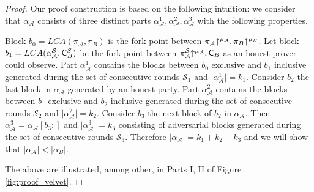 \begin{proof}
Our proof construction is based on the following intuition: we consider that $\alpha_\mathcal{A}$ consists of three distinct parts $\alpha_\mathcal{A}^1, \alpha_\mathcal{A}^2, \alpha_\mathcal{A}^3$ with the following properties.

Block $b_0 = LCA(\pi_\mathcal{A}, \pi_B)$ is the fork point between $\pi_\mathcal{A} \negthickspace\uparrow^{\mu_\mathcal{A}}, \pi_B \negthickspace\uparrow^{\mu_B}$. Let block $b_1 = LCA (\alpha^{\mathcal{S}}_\mathcal{A}, \mathsf{C}^S_B)$ be the fork point between $\pi^{\mathcal{S}}_\mathcal{A} \negthickspace\uparrow^{\mu_\mathcal{A}}, \mathsf{C}_B $ as an honest prover could observe. Part $\alpha_\mathcal{A}^1$ contains the blocks between $b_0$ exclusive and $b_1$ inclusive generated during the set of consecutive rounds $\mathcal{S}_1$ and $\lvert  \alpha_\mathcal{A}^1 \rvert = k_1$. Consider $b_2$ the last block in $\alpha_\mathcal{A}$ generated by an honest party. Part $\alpha_{\mathcal{A}}^2$ contains the blocks between $b_1$ exclusive and $b_2$ inclusive generated during the set of consecutive rounds $\mathcal{S}_2$ and $\vert  \alpha_\mathcal{A}^2 \vert = k_2$. Consider $b_3$ the next block of $b_2$ in $\alpha_\mathcal{A}$. Then $\alpha_{\mathcal{A}}^3 = \alpha_\mathcal{A}[b_3{:}]$ and $\vert  \alpha_\mathcal{A}^3 \vert = k_3$ consisting of adversarial blocks generated during the set of consecutive rounds $\mathcal{S}_3$. Therefore $\vert \alpha_\mathcal{A} \vert = k_1 + k_2 + k_3$ and we will show that $\vert \alpha_\mathcal{A} \vert < \vert \alpha_B \vert$.

The above are illustrated, among other, in Parts I, II of Figure \ref{fig:proof_velvet}.


\end{proof}
